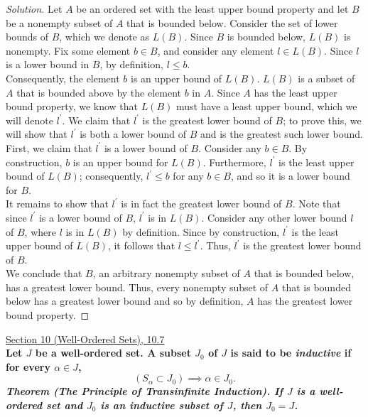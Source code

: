 \documentclass[11pt]{article}
\newenvironment{solution}
  {\renewcommand\qedsymbol{$\blacksquare$}\begin{proof}[Solution]}
  {\end{proof}}
\begin{document}
\begin{solution}
Let $A$ be an ordered set with the least upper bound property and let $B$ be a nonempty subset of $A$ that is bounded below. Consider the set of lower bounds of $B$, which we denote as $L(B)$. Since $B$ is bounded below,
$L(B)$ is nonempty. Fix some element $b \in B$, and consider any element $l \in L(B)$. Since $l$ is a lower bound in $B$, by definition, $l \leq b$. \\

Consequently, the element $b$ is an upper bound of $L(B)$. $L(B)$ is a subset of $A$ that is bounded above by the element $b$ in $A$. Since $A$ has the least upper bound property,
we know that $L(B)$ must have a least upper bound, which we will denote $l^{\prime}$. We claim that $l^{\prime}$ is the greatest lower bound of $B$; to prove this,
we will show that $l^{\prime}$ is both a lower bound of $B$ and is the greatest such lower bound.\\

First, we claim that $l^{\prime}$ is a lower bound of $B$. Consider any $b \in B$. By construction, $b$ is an upper bound for $L(B)$. Furthermore, $l^{\prime}$ is the least upper bound of $L(B)$;
consequently, $l^{\prime} \leq b$ for any $b \in B$, and so it is a lower bound for $B$. \\

It remains to show that $l^{\prime}$ is in fact the greatest lower bound of $B$. Note that since $l^{\prime}$ is a lower bound of $B$, $l^{\prime}$ is in $L(B)$. 
Consider any other lower bound $l$ of $B$, where $l$ is in $L(B)$ by definition.
Since by construction, $l^{\prime}$ is the least upper bound of $L(B)$, it follows that $l \leq l^{\prime}$. Thus, $l^{\prime}$ is the greatest lower bound of $B$. \\

We conclude that $B$, an arbitrary nonempty subset of $A$ that is bounded below, has a greatest lower bound. Thus, every nonempty subset of $A$ that is bounded below has a greatest lower bound
and so by definition, $A$ has the greatest lower bound property. 
\end{solution}
\newpage

\underline{Section 10 (Well-Ordered Sets), 10.7} \\

\textbf{Let $J$ be a well-ordered set. A subset $J_0$ of $J$ is said to be \textit{inductive} if for every $\alpha \in J$,}
\[
  (S_\alpha \subset J_0) \implies \alpha \in J_0.
\]
\textbf{\textit{Theorem (The Principle of Transinfinite Induction). If $J$ is a well-ordered set and $J_0$ is an inductive subset of $J$, then $J_0 = J$.}}
\end{document}
